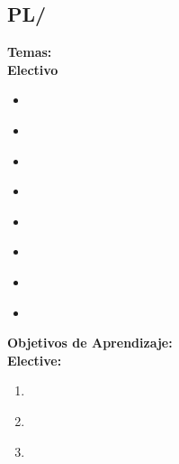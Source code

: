 \subsection{PL/\PLAdvancedProgrammingConstructs}\label{sec:BOK:PLAdvancedProgrammingConstructs}
\noindent \textbf{Temas:}\\
\noindent \textbf{Electivo}
\begin{itemize}
	\item \PLAdvancedProgrammingConstructsTopicLazy\label{sec:BOK:PLAdvancedProgrammingConstructsTopicLazy}
	\item \PLAdvancedProgrammingConstructsTopicControl\label{sec:BOK:PLAdvancedProgrammingConstructsTopicControl}
	\item \PLAdvancedProgrammingConstructsTopicObject\label{sec:BOK:PLAdvancedProgrammingConstructsTopicObject}
	\item \PLAdvancedProgrammingConstructsTopicMetaprogramming\label{sec:BOK:PLAdvancedProgrammingConstructsTopicMetaprogramming}
	\item \PLAdvancedProgrammingConstructsTopicModule\label{sec:BOK:PLAdvancedProgrammingConstructsTopicModule}
	\item \PLAdvancedProgrammingConstructsTopicString\label{sec:BOK:PLAdvancedProgrammingConstructsTopicString}
	\item \PLAdvancedProgrammingConstructsTopicDynamic\label{sec:BOK:PLAdvancedProgrammingConstructsTopicDynamic}
	\item \PLAdvancedProgrammingConstructsTopicLanguage\label{sec:BOK:PLAdvancedProgrammingConstructsTopicLanguage}
\end{itemize}


\noindent \textbf{Objetivos de Aprendizaje:}\\
\noindent \textbf{Elective:}
\begin{enumerate}
	\setcounter{enumi}{0}
	\item \PLAdvancedProgrammingConstructsLOUseVarious\xspace[\PLAdvancedProgrammingConstructsLOUseVariousLevel]\label{sec:BOK:PLAdvancedProgrammingConstructsLOUseVarious}
	\item \PLAdvancedProgrammingConstructsLODiscussHowProgramming\xspace[\PLAdvancedProgrammingConstructsLODiscussHowProgrammingLevel]\label{sec:BOK:PLAdvancedProgrammingConstructsLODiscussHowProgramming}
	\item \PLAdvancedProgrammingConstructsLODiscussHowProgrammingWith\xspace[\PLAdvancedProgrammingConstructsLODiscussHowProgrammingWithLevel]\label{sec:BOK:PLAdvancedProgrammingConstructsLODiscussHowProgrammingWith}
\end{enumerate}


